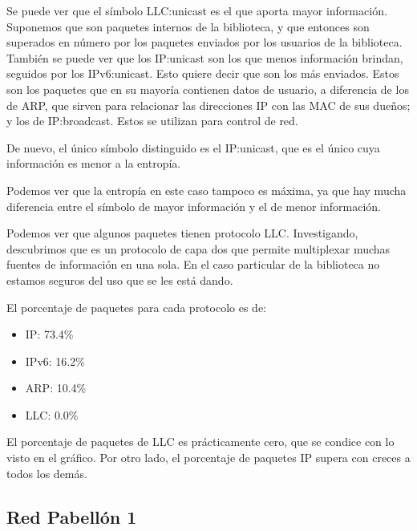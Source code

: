 

Se puede ver que el símbolo LLC:unicast es el que aporta mayor información.
Suponemos que son paquetes internos de la biblioteca, y que entonces son
superados en número por los paquetes enviados por los usuarios de la biblioteca.
También se puede ver que los IP:unicast son los que menos información brindan,
seguidos por los IPv6:unicast. Esto quiere decir que son los más enviados.
Estos son los paquetes que en su mayoría contienen datos de usuario,
a diferencia de los de ARP, que sirven para relacionar las direcciones IP con
las MAC de sus dueños; y los de IP:broadcast. Estos se utilizan para control de red.



De nuevo, el único símbolo distinguido es el IP:unicast, que es el único cuya
información es menor a la entropía.

Podemos ver que la entropía en este caso tampoco es máxima, ya que hay mucha 
diferencia entre el símbolo de mayor información y el de menor información.

Podemos ver que algunos paquetes tienen protocolo LLC. Investigando, descubrimos
que es un protocolo de capa dos que permite multiplexar muchas fuentes de
información en una sola. En el caso particular de la biblioteca no
estamos seguros del uso que se les está dando.


El porcentaje de paquetes para cada protocolo es de:
\begin{itemize}
\item IP: 73.4\%
\item IPv6: 16.2\%
\item ARP: 10.4\%
\item LLC: 0.0\%
\end{itemize}

El porcentaje de paquetes de LLC es prácticamente cero, que se condice con lo
visto en el gráfico. Por otro lado, el porcentaje de paquetes IP supera con
creces a todos los demás.


\subsection{Red Pabellón 1}
